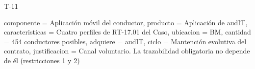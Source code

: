 \begin{formulario}{T-11}
\begin{formularioTOnce}
{  componente = Aplicación móvil del conductor,
  producto = {Aplicación de audIT},
  caracteristicas = {Cuatro perfiles de RT-17.01 del Caso},
  ubicacion = BM,
  cantidad = {454 conductores posibles},
  adquiere = audIT,
  ciclo = {Mantención evolutiva del contrato},
  justificacion = {Canal voluntario. La trazabilidad obligatoria no depende de él (restricciones 1 y 2)}
}
\end{formularioTOnce}
\par\vspace{6pt}
\end{formulario}
